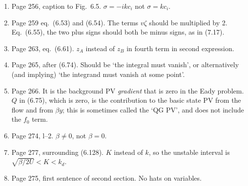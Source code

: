 \documentclass[10pt]{article}
\newcommand{\eq}{eq.\ } \newcommand{\Eq}{Eq.\ }
\begin{document}
\begin{enumerate}
\item Page 256, caption to Fig.\ 6.5. $\sigma = -i k c_i$ not $\sigma = kc_i$.


\item Page 259 \eq (6.53) and (6.54). The terms $v \zeta$ should be multiplied by 2. \\ Eq.\ (6.55), the two plus signs should both be minus signs, as in (7.17).


\item Page 263, \eq (6.61). $z_A$ instead of $z_B$ in fourth term in second expression. 

\item Page 265, after (6.74). Should be `the integral must vanish', or alternatively (and implying) `the integrand must vanish at some point'. 


\item Page 266. It is the background PV \emph{gradient} that is zero in the Eady problem. $Q$ in (6.75), which is zero, is the contribution to the basic state PV from the flow and from $\beta y$; this is sometimes called the `QG PV', and does not include the $f_0$ term. 




\item Page 274, l--2. $\beta \neq 0$, not $\beta = 0$. 

\item Page 277, surrounding (6.128). $K$ instead of $k$, so the unstable interval is $\sqrt{\beta/2U} < K < k_d$.

\item Page 275, first sentence of second section. No hats on variables.



\end{enumerate}
\end{document}

